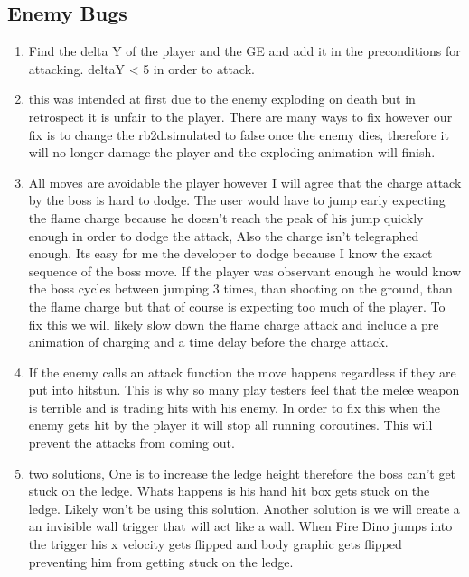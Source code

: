 \documentclass{article}
\begin{document}
\subsection*{Enemy Bugs}
\begin{enumerate}
		\item Find the delta Y of the player and the GE and add it in the preconditions for attacking. deltaY < 5 in order to attack. 
			\item this was intended at first due to the enemy exploding on death but in retrospect it is unfair to the player. There are many ways to fix however our fix is to change the rb2d.simulated to false once the enemy dies, therefore it will no longer damage the player and the exploding animation will finish.
				\item All moves are avoidable the player however I will agree that the charge attack by the boss is hard to dodge. The user would have to jump early expecting the flame charge because he doesn't reach the peak of his jump quickly enough in order to dodge the attack, Also the charge isn't telegraphed enough. Its easy for me the developer to dodge because I know the exact sequence of the boss move. If the player was observant enough he would know the boss cycles between jumping 3 times, than shooting on the ground, than the flame charge but that of course is expecting too much of the player. To fix this we will likely slow down the flame charge attack and include a pre animation of charging and a time delay before the charge attack.
					\item If the enemy calls an attack function the move happens regardless if they are put into hitstun. This is why so many play testers feel that the melee weapon is terrible and is trading hits with his enemy. In order to fix this when the enemy gets hit by the player it will stop all running coroutines. This will prevent the attacks from coming out.
						\item two solutions, One is to increase the ledge height therefore the boss can't get stuck on the ledge. Whats happens  is  his hand hit box gets stuck on the ledge. Likely won't be using this solution. Another solution is we will create a an invisible wall trigger that will act like a wall. When Fire Dino jumps into the trigger his x velocity gets flipped and body graphic gets flipped preventing him from getting stuck on the ledge.
						

\end{enumerate}
\end{document}

